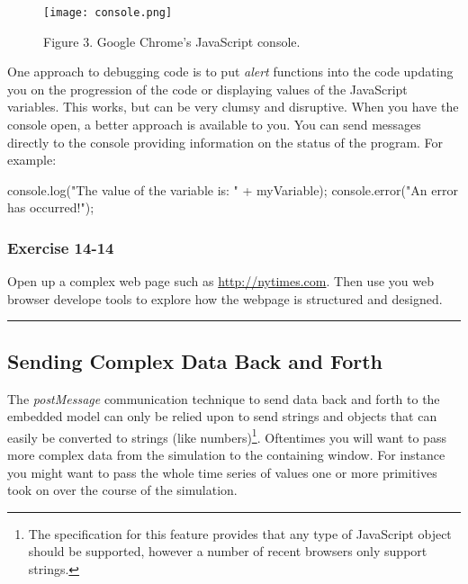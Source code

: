\documentclass[]{memoir}
\makeatletter
\newenvironment{Shaded}{}{}
\newcommand{\StringTok}[1]{\textcolor[rgb]{0.25,0.44,0.63}{{#1}}}
\newcommand{\OtherTok}[1]{\textcolor[rgb]{0.00,0.44,0.13}{{#1}}}
\newcommand{\FunctionTok}[1]{\textcolor[rgb]{0.02,0.16,0.49}{{#1}}}
\newcommand{\NormalTok}[1]{{#1}}
\def\maxwidth{\ifdim\Gin@nat@width>\linewidth\linewidth
\else\Gin@nat@width\fi}
\let\Oldincludegraphics\includegraphics
\renewcommand{\includegraphics}[1]{\Oldincludegraphics[width=\maxwidth]{#1}}
\makeatother
\begin{document}
\begin{figure}[htbp]
\centering
\texttt{[image: console.png]}
\caption{Figure 3. Google Chrome's JavaScript console.}
\end{figure}

One approach to debugging code is to put \emph{alert} functions into the
code updating you on the progression of the code or displaying values of
the JavaScript variables. This works, but can be very clumsy and
disruptive. When you have the console open, a better approach is
available to you. You can send messages directly to the console
providing information on the status of the program. For example:

\begin{Shaded}
\begin{Highlighting}[]
\OtherTok{console}\NormalTok{.}\FunctionTok{log}\NormalTok{(}\StringTok{"The value of the variable is: "} \NormalTok{+ myVariable);}
\OtherTok{console}\NormalTok{.}\FunctionTok{error}\NormalTok{(}\StringTok{"An error has occurred!"}\NormalTok{);}
\end{Highlighting}
\end{Shaded}

\subsubsection{Exercise 14-14}

Open up a complex web page such as \url{http://nytimes.com}. Then use
you web browser develope tools to explore how the webpage is structured
and designed.

\begin{center}\rule{3in}{0.4pt}\end{center}

\subsection{Sending Complex Data Back and Forth}

The \emph{postMessage} communication technique to send data back and
forth to the embedded model can only be relied upon to send strings and
objects that can easily be converted to strings (like numbers)\footnote{The
  specification for this feature provides that any type of JavaScript
  object should be supported, however a number of recent browsers only
  support strings.}. Oftentimes you will want to pass more complex data
from the simulation to the containing window. For instance you might
want to pass the whole time series of values one or more primitives took
on over the course of the simulation.
\end{document}
